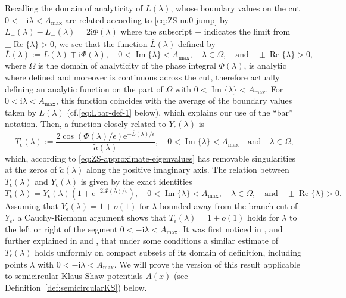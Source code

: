 \documentclass[12pt]{amsart}
\numberwithin{equation}{section}
\newcommand{\ee}{\mathrm{e}}
\newcommand{\ii}{\mathrm{i}}
\newcommand{\SP}{\lambda}
\newcommand{\phaseint}{\Phi}
\DeclareMathOperator{\imag}{Im}
\DeclareMathOperator{\re}{Re}
\begin{document}
Recalling the domain of analyticity of $L(\SP)$, whose boundary values on the cut $0<-\ii\SP<A_\mathrm{max}$ are related according to \eqref{eq:ZS-nu0-jump} by $L_+(\SP)-L_-(\SP)=2\ii\phaseint(\SP)$ where the subscript $\pm$ indicates the limit from $\pm\re\{\SP\}>0$, we see that the function $\overline{L}(\SP)$ defined by 
\begin{equation}
\overline{L}(\SP):= L(\SP)\mp \ii\phaseint(\SP),\quad 0<\imag\{\SP\}<A_\mathrm{max},\quad
\SP\in\Omega,\quad\text{and}\quad\pm\re\{\SP\}>0,
\label{eq:Lbar-def-3}
\end{equation}
where $\Omega$ is the domain of analyticity of the phase integral $\phaseint(\SP)$,
is analytic where defined and moreover is continuous across the cut, therefore 
actually defining an analytic function on the part of $\Omega$ with $0<\imag\{\SP\}<A_\mathrm{max}$.
For $0<\ii\SP<A_\mathrm{max}$, this function coincides with the average of the boundary values taken by $L(\SP)$
(cf.\@ \eqref{eq:Lbar-def-1} below), 
which explains our use of the ``bar'' notation.  
Then, a function closely related to $Y_\epsilon(\SP)$ is
\begin{equation}
T_\epsilon(\SP):=\frac{2\cos(\phaseint(\SP)/\epsilon)\ee^{-\overline{L}(\SP)/\epsilon}}{\widetilde{a}(\SP)},
\quad 0<\imag\{\SP\}<A_\mathrm{max}\quad\text{and}\quad \SP\in\Omega,
\label{eq:ZS-T-define}
\end{equation}
which, according to \eqref{eq:ZS-approximate-eigenvalues} has removable singularities at the zeros of $\widetilde{a}(\SP)$ along the positive imaginary axis.  The relation between $T_\epsilon(\SP)$ and $Y_\epsilon(\SP)$ is given by the exact identities
\begin{equation}
T_\epsilon(\SP)=Y_\epsilon(\SP)(1+\ee^{\pm 2\ii\phaseint(\SP)/\epsilon}),\quad 0<\imag\{\SP\}<A_\mathrm{max},\quad \SP\in\Omega,\quad\text{and}\quad \pm\re\{\SP\}>0.
\label{eq:T-Y-relation}
\end{equation}
Assuming that $Y_\epsilon(\SP)=1+o(1)$ for $\SP$ bounded away from the branch cut of $Y_\epsilon$, a Cauchy-Riemann argument shows that $T_\epsilon(\SP)=1+o(1)$ holds for $\SP$ to the left or right of the segment $0<-\ii\SP<A_\mathrm{max}$.  It was first noticed in \cite{Miller02}, and further explained in \cite{BaikKMM07} and \cite{LyngM07}, that under some conditions a similar estimate of $T_\epsilon(\SP)$ holds uniformly on compact subsets of its domain of definition, including points $\SP$ with $0<-\ii\SP<A_\mathrm{max}$.  We will prove the version of this result applicable to semicircular Klaus-Shaw potentials $A(x)$ (see Definition~\ref{def:semicircularKS}) below.
\end{document}
